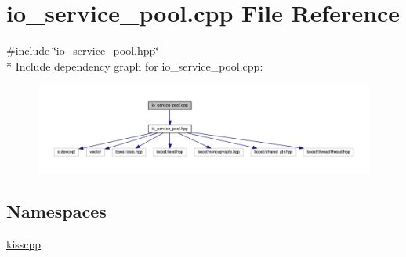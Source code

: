 \hypertarget{a00061}{\section{io\-\_\-service\-\_\-pool.\-cpp File Reference}
\label{a00061}
}
{\ttfamily \#include \char`\"{}io\-\_\-service\-\_\-pool.\-hpp\char`\"{}}\\*
Include dependency graph for io\-\_\-service\-\_\-pool.\-cpp\-:\nopagebreak
\begin{figure}[H]
\begin{center}
\leavevmode
\includegraphics[width=350pt]{a00107}
\end{center}
\end{figure}
\subsection*{Namespaces}
\begin{DoxyCompactItemize}
\item 
\hyperlink{a00089}{kisscpp}
\end{DoxyCompactItemize}
